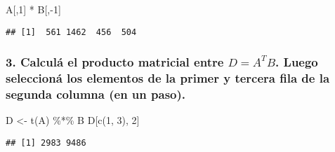 \documentclass[
]{article}
\newenvironment{Shaded}{\begin{snugshade}}{\end{snugshade}}
\newcommand{\DecValTok}[1]{\textcolor[rgb]{0.00,0.00,0.81}{#1}}
\newcommand{\FunctionTok}[1]{\textcolor[rgb]{0.00,0.00,0.00}{#1}}
\newcommand{\NormalTok}[1]{#1}
\newcommand{\OtherTok}[1]{\textcolor[rgb]{0.56,0.35,0.01}{#1}}
\newcommand{\SpecialCharTok}[1]{\textcolor[rgb]{0.00,0.00,0.00}{#1}}
\begin{document}
\begin{Shaded}
\begin{Highlighting}[]
\NormalTok{A[,}\DecValTok{1}\NormalTok{] }\SpecialCharTok{*}\NormalTok{ B[,}\SpecialCharTok{{-}}\DecValTok{1}\NormalTok{]}
\end{Highlighting}
\end{Shaded}

\begin{verbatim}
## [1]  561 1462  456  504
\end{verbatim}

\hypertarget{calculuxe1-el-producto-matricial-entre-d-atb.-luego-seleccionuxe1-los-elementos-de-la-primer-y-tercera-fila-de-la-segunda-columna-en-un-paso.}{%
\subsubsection{\texorpdfstring{3. Calculá el producto matricial entre
\(D = A^TB\). Luego seleccioná los elementos de la primer y tercera fila
de la segunda columna (en un
paso).}{3. Calculá el producto matricial entre D = A\^{}TB. Luego seleccioná los elementos de la primer y tercera fila de la segunda columna (en un paso).}}\label{calculuxe1-el-producto-matricial-entre-d-atb.-luego-seleccionuxe1-los-elementos-de-la-primer-y-tercera-fila-de-la-segunda-columna-en-un-paso.}}

\begin{Shaded}
\begin{Highlighting}[]
\NormalTok{D }\OtherTok{\textless{}{-}} \FunctionTok{t}\NormalTok{(A) }\SpecialCharTok{\%*\%}\NormalTok{ B}
\NormalTok{D[}\FunctionTok{c}\NormalTok{(}\DecValTok{1}\NormalTok{, }\DecValTok{3}\NormalTok{), }\DecValTok{2}\NormalTok{]}
\end{Highlighting}
\end{Shaded}

\begin{verbatim}
## [1] 2983 9486
\end{verbatim}
\end{document}
